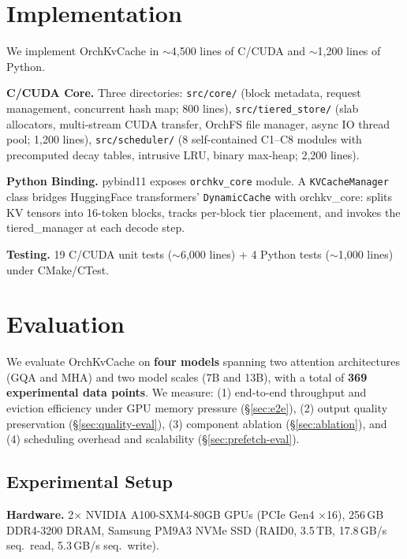 \documentclass[conference]{IEEEtran}
\begin{document}
\section{Implementation}

We implement OrchKvCache in ${\sim}$4,500 lines of C/CUDA and ${\sim}$1,200 lines of Python.

\textbf{C/CUDA Core.} Three directories: \texttt{src/core/} (block metadata, request management, concurrent hash map; 800 lines), \texttt{src/tiered\_store/} (slab allocators, multi-stream CUDA transfer, OrchFS file manager, async IO thread pool; 1,200 lines), \texttt{src/scheduler/} (8 self-contained C1--C8 modules with precomputed decay tables, intrusive LRU, binary max-heap; 2,200 lines).

\textbf{Python Binding.} pybind11 exposes \texttt{orchkv\_core} module. A \texttt{KVCacheManager} class bridges HuggingFace transformers' \texttt{DynamicCache} with orchkv\_core: splits KV tensors into 16-token blocks, tracks per-block tier placement, and invokes the tiered\_manager at each decode step.

\textbf{Testing.} 19 C/CUDA unit tests (${\sim}$6,000 lines) + 4 Python tests (${\sim}$1,000 lines) under CMake/CTest.

\section{Evaluation}

We evaluate OrchKvCache on \textbf{four models} spanning two attention architectures (GQA and MHA) and two model scales (7B and 13B), with a total of \textbf{369 experimental data points}. We measure: (1) end-to-end throughput and eviction efficiency under GPU memory pressure (\S\ref{sec:e2e}), (2) output quality preservation (\S\ref{sec:quality-eval}), (3) component ablation (\S\ref{sec:ablation}), and (4) scheduling overhead and scalability (\S\ref{sec:prefetch-eval}).

\subsection{Experimental Setup}

\textbf{Hardware.} 2$\times$ NVIDIA A100-SXM4-80GB GPUs (PCIe Gen4 $\times$16), 256\,GB DDR4-3200 DRAM, Samsung PM9A3 NVMe SSD (RAID0, 3.5\,TB, 17.8\,GB/s seq.\ read, 5.3\,GB/s seq.\ write).
\end{document}
